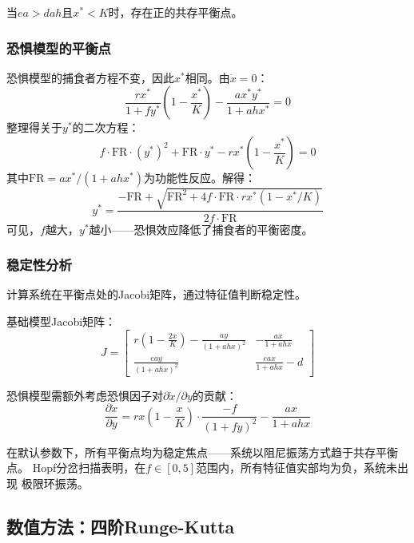 \documentclass[UTF8]{ctexart}
\begin{document}
当$e a > d a h$且$x^* < K$时，存在正的共存平衡点。

\subsubsection{恐惧模型的平衡点}

恐惧模型的捕食者方程不变，因此$x^*$相同。由$\dot{x}=0$：
\begin{equation}
    \frac{r x^*}{1 + f y^*}\left(1 - \frac{x^*}{K}\right) - \frac{a x^* y^*}{1 + a h x^*} = 0
\end{equation}
整理得关于$y^*$的二次方程：
\begin{equation}
    f \cdot \mathrm{FR} \cdot (y^*)^2 + \mathrm{FR} \cdot y^* - r x^*\left(1 - \frac{x^*}{K}\right) = 0
\end{equation}
其中$\mathrm{FR} = a x^* / (1 + a h x^*)$为功能性反应。解得：
\begin{equation}
    y^* = \frac{-\mathrm{FR} + \sqrt{\mathrm{FR}^2 + 4 f \cdot \mathrm{FR} \cdot r x^*(1 - x^*/K)}}{2 f \cdot \mathrm{FR}}
\end{equation}
可见，$f$越大，$y^*$越小——恐惧效应降低了捕食者的平衡密度。

\subsubsection{稳定性分析}

计算系统在平衡点处的Jacobi矩阵，通过特征值判断稳定性。

基础模型Jacobi矩阵：
\begin{equation}
    J = \begin{bmatrix}
        r(1 - \frac{2x}{K}) - \frac{a y}{(1 + a h x)^2} & -\frac{a x}{1 + a h x} \\[6pt]
        \frac{e a y}{(1 + a h x)^2} & \frac{e a x}{1 + a h x} - d
    \end{bmatrix}
\end{equation}

恐惧模型需额外考虑恐惧因子对$\partial \dot{x}/\partial y$的贡献：
\begin{equation}
    \frac{\partial \dot{x}}{\partial y} = r x(1 - \frac{x}{K}) \cdot \frac{-f}{(1 + f y)^2} - \frac{a x}{1 + a h x}
\end{equation}

在默认参数下，所有平衡点均为稳定焦点——系统以阻尼振荡方式趋于共存平衡点。
Hopf分岔扫描表明，在$f \in [0, 5]$范围内，所有特征值实部均为负，系统未出现
极限环振荡。

\subsection{数值方法：四阶Runge-Kutta}
\end{document}
